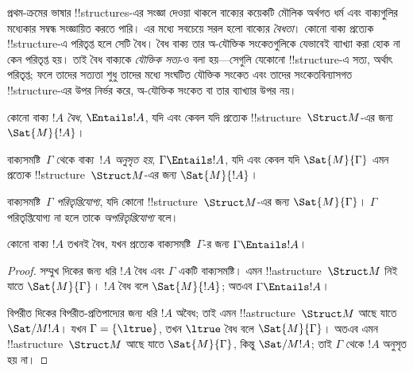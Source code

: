 \documentclass[../../../include/open-logic-section]{subfiles}
\begin{document}

\begin{explain}
প্রথম-ক্রমের ভাষার !!{structure}s-এর সংজ্ঞা দেওয়া থাকলে বাক্যের কয়েকটি
মৌলিক অর্থগত ধর্ম এবং বাক্যগুলির মধ্যেকার সম্বন্ধ সংজ্ঞায়িত করতে পারি।
এর মধ্যে সবচেয়ে সরল হলো বাক্যের \emph{বৈধতা}। কোনো বাক্য প্রত্যেক
!!{structure}-এ পরিতৃপ্ত হলে সেটি বৈধ। বৈধ বাক্য তার অ-যৌক্তিক
সংকেতগুলিকে যেভাবেই ব্যাখ্যা করা হোক না কেন পরিতৃপ্ত হয়। তাই বৈধ
বাক্যকে \emph{যৌক্তিক সত্য}-ও বলা হয়—সেগুলি যেকোনো !!{structure}-এ
সত্য, অর্থাৎ পরিতৃপ্ত; ফলে তাদের সত্যতা শুধু তাদের মধ্যে সংঘটিত যৌক্তিক
সংকেত এবং তাদের সংকেতবিন্যাসগত !!{structure}-এর উপর নির্ভর করে,
অ-যৌক্তিক সংকেত বা তার ব্যাখ্যার উপর নয়।
\end{explain}

\begin{defn}[বৈধতা]
কোনো বাক্য $!A$ \emph{বৈধ}, $\Entails !A$, যদি এবং কেবল যদি প্রত্যেক
!!{structure}~$\Struct M$-এর জন্য $\Sat{M}{!A}$।
\end{defn}

\begin{defn}[ফলশ্রুতি]
বাক্যসমষ্টি~$\Gamma$ থেকে বাক্য~$!A$ \emph{অনুসৃত হয়},
$\Gamma \Entails !A$, যদি এবং কেবল যদি $\Sat{M}{\Gamma}$ এমন প্রত্যেক
!!{structure}~$\Struct M$-এর জন্য $\Sat{M}{!A}$।
\end{defn}


\begin{defn}[পরিতৃপ্তিযোগ্যতা]
বাক্যসমষ্টি~$\Gamma$ \emph{পরিতৃপ্তিযোগ্য}, যদি কোনো
!!{structure}~$\Struct M$-এর জন্য $\Sat{M}{\Gamma}$। $\Gamma$
পরিতৃপ্তিযোগ্য না হলে তাকে \emph{অপরিতৃপ্তিযোগ্য} বলে।
\end{defn}

\begin{prop}
কোনো বাক্য $!A$ তখনই বৈধ, যখন প্রত্যেক বাক্যসমষ্টি~$\Gamma$-র জন্য
$\Gamma \Entails !A$।
\end{prop}

\begin{proof}
সম্মুখ দিকের জন্য ধরি $!A$ বৈধ এবং $\Gamma$ একটি বাক্যসমষ্টি। এমন
!!a{structure}~$\Struct M$ নিই যাতে $\Sat{M}{\Gamma}$। $!A$ বৈধ বলে
$\Sat{M}{!A}$; অতএব $\Gamma \Entails !A$।

বিপরীত দিকের বিপরীত-প্রতিপাদ্যের জন্য ধরি $!A$ অবৈধ; তাই এমন
!!a{structure}~$\Struct M$ আছে যাতে $\Sat/{M}{!A}$। যখন
$\Gamma = \{ \ltrue \}$, তখন $\ltrue$ বৈধ বলে $\Sat{M}{\Gamma}$।
অতএব এমন !!a{structure}~$\Struct M$ আছে যাতে $\Sat{M}{\Gamma}$,
কিন্তু $\Sat/{M}{!A}$; তাই $\Gamma$ থেকে $!A$ অনুসৃত হয় না।
\end{proof}
\end{document}
